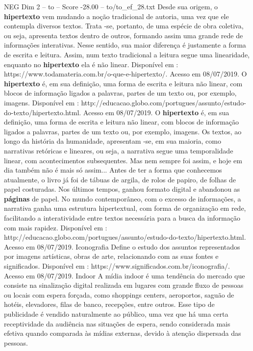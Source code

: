 \begin{textsample}{NEG Dim 2 – to – Score -28.00 – to/to\_ef\_28.txt}
Desde sua origem, o \textbf{hipertexto} vem mudando a noção tradicional de autoria, uma vez que ele contempla diversos textos.
Trata -se, portanto, de uma espécie de obra coletiva, ou seja, apresenta textos dentro de outros, formando assim uma grande rede de informações interativas.
Nesse sentido, sua maior diferença é justamente a forma de escrita e leitura.
Assim, num texto tradicional a leitura segue uma linearidade, enquanto no \textbf{hipertexto} ela é não linear.
Disponível em : https://www.todamateria.com.br/o-que-e-hipertexto/.
Acesso em 08/07/2019.
O \textbf{hipertexto} é, em sua definição, uma forma de escrita e leitura não linear, com blocos de informação ligados a palavras, partes de um texto ou, por exemplo, imagens.
Disponível em : http://educacao.globo.com/portugues/assunto/estudo-do-texto/hipertexto.html.
Acesso em 08/07/2019.
O \textbf{hipertexto} é, em sua definição, uma forma de escrita e leitura não linear, com blocos de informação ligados a palavras, partes de um texto ou, por exemplo, imagens.
Os textos, ao longo da história da humanidade, apresentam -se, em sua maioria, como narrativas retóricas e lineares, ou seja, a narrativa segue uma temporalidade linear, com acontecimentos subsequentes.
Mas nem sempre foi assim, e hoje em dia também não é mais só assim...
Antes de ter a forma que conhecemos atualmente, o livro já foi de tábuas de argila, de rolos de papiro, de folhas de papel costuradas.
Nos últimos tempos, ganhou formato digital e abandonou as \textbf{páginas} de papel.
No mundo contemporâneo, com o excesso de informações, a narrativa ganha uma estrutura hipertextual, com forma de organização em rede, facilitando a interatividade entre textos necessária para a busca da informação com mais rapidez.
Disponível em : http://educacao.globo.com/portugues/assunto/estudo-do-texto/hipertexto.html.
Acesso em 08/07/2019.
Iconografia Define o estudo dos assuntos representados por imagens artísticas, obras de arte, relacionando com as suas fontes e significados.
Disponível em : https://www.significados.com.br/iconografia/.
Acesso em 08/07/2019.
Indoor A mídia indoor é uma tendência do mercado que consiste na sinalização digital realizada em lugares com grande fluxo de pessoas ou locais com espera forçada, como shoppings centers, aeroportos, saguão de hotéis, elevadores, filas de banco, recepções, entre outros.
Esse tipo de publicidade é vendido naturalmente ao público, uma vez que há uma certa receptividade da audiência nas situações de espera, sendo considerada mais efetiva quando comparada às mídias externas, devido à atenção dispersada das pessoas.

\end{textsample}

